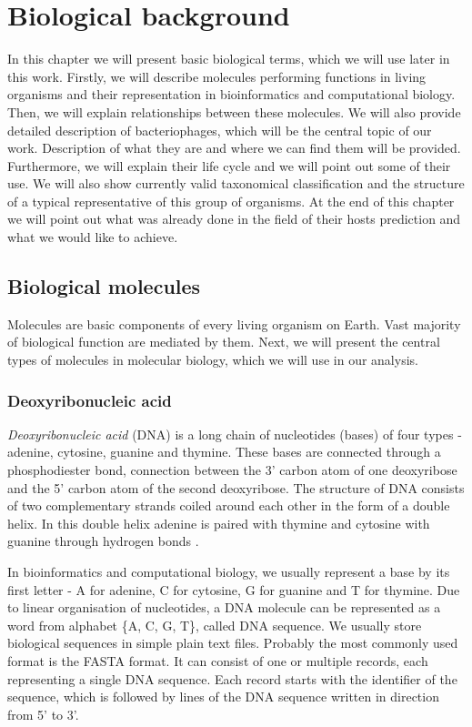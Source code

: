 \chapter{Biological background}
In this chapter we will present basic biological terms, which we will use later in this work.
Firstly, we will describe molecules performing functions in living organisms and their representation in bioinformatics and computational biology.
Then, we will explain relationships between these molecules.
We will also provide detailed description of bacteriophages, which will be the central topic of our work.
Description of what they are and where we can find them will be provided.
Furthermore, we will explain their life cycle and we will point out some of their use.
We will also show currently valid taxonomical classification and the structure of a typical representative of this group of organisms.
At the end of this chapter we will point out what was already done in the field of their hosts prediction and what we would like to achieve.

\section{Biological molecules}
Molecules are basic components of every living organism on Earth.
Vast majority of biological function are mediated by them.
Next, we will present the central types of molecules in molecular biology, which we will use in our analysis.

\subsection{Deoxyribonucleic acid}
\emph{Deoxyribonucleic acid} (DNA) is a long chain of nucleotides (bases) of four types - adenine, cytosine, guanine and thymine.
These bases are connected through a phosphodiester bond, connection between the 3' carbon atom of one deoxyribose and the 5' carbon atom of the second deoxyribose.
The structure of DNA consists of two complementary strands coiled around each other in the form of a double helix.
In this double helix adenine is paired with thymine and cytosine with guanine through hydrogen bonds \cite{}.

In bioinformatics and computational biology, we usually represent a base by its first letter - A for adenine, C for cytosine, G for guanine and T for thymine.
Due to linear organisation of nucleotides, a DNA molecule can be represented as a word from alphabet \{A, C, G, T\}, called DNA sequence. We usually store biological sequences in simple plain text files.
Probably the most commonly used format is the FASTA format.
It can consist of one or multiple records, each representing a single DNA sequence.
Each record starts with the identifier of the sequence, which is followed by lines of the DNA sequence written in direction from 5' to 3'.


